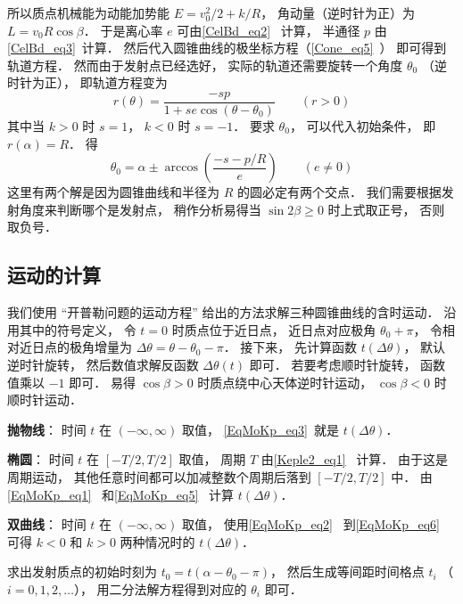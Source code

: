 所以质点机械能为动能加势能 $E = v_0^2/2 + k/R$， 角动量（逆时针为正）为 $L = v_0 R\cos\beta$． 于是离心率 $e$ 可由\autoref{CelBd_eq2}~ 计算， 半通径 $p$ 由\autoref{CelBd_eq3}~计算． 然后代入圆锥曲线的极坐标方程（\autoref{Cone_eq5}~） 即可得到轨道方程． 然而由于发射点已经选好， 实际的轨道还需要旋转一个角度 $\theta_0$ （逆时针为正）， 即轨道方程变为
\begin{equation}\label{KepNum_eq1}
r(\theta)  = \frac{-s p}{1 + s e\cos (\theta-\theta_0)} \qquad (r > 0)
\end{equation}
其中当 $k>0$ 时 $s=1$， $k<0$ 时 $s=-1$． 要求 $\theta_0$， 可以代入初始条件， 即 $r(\alpha) = R$． 得
\begin{equation}
\theta_0 = \alpha \pm \arccos(\frac{-s - p/R}{e}) \qquad (e\ne 0)
\end{equation}
这里有两个解是因为圆锥曲线和半径为 $R$ 的圆必定有两个交点． 我们需要根据发射角度来判断哪个是发射点， 稍作分析易得当 $\sin2\beta \geqslant 0$ 时上式取正号， 否则取负号．

\subsection{运动的计算}


我们使用 “开普勒问题的运动方程” 给出的方法求解三种圆锥曲线的含时运动． 沿用其中的符号定义， 令 $t=0$ 时质点位于近日点，  近日点对应极角 $\theta_0 + \pi$， 令相对近日点的极角增量为 $\Delta\theta = \theta - \theta_0 - \pi$． 接下来， 先计算函数 $t(\Delta\theta)$， 默认逆时针旋转， 然后数值求解反函数 $\Delta\theta(t)$ 即可． 若要考虑顺时针旋转， 函数值乘以 $-1$ 即可． 易得 $\cos\beta > 0$ 时质点绕中心天体逆时针运动， $\cos\beta < 0$ 时顺时针运动．

\textbf{抛物线}： 时间 $t$ 在 $(-\infty,\infty)$ 取值， \autoref{EqMoKp_eq3}~就是 $t(\Delta\theta)$．

\textbf{椭圆}： 时间 $t$ 在 $[-T/2,T/2]$ 取值， 周期 $T$ 由\autoref{Keple2_eq1}~ 计算． 由于这是周期运动， 其他任意时间都可以加减整数个周期后落到 $[-T/2,T/2]$ 中． 由\autoref{EqMoKp_eq1}~ 和\autoref{EqMoKp_eq5}~ 计算 $t(\Delta\theta)$．

\textbf{双曲线}： 时间 $t$ 在 $(-\infty,\infty)$ 取值， 使用\autoref{EqMoKp_eq2}~ 到\autoref{EqMoKp_eq6}~ 可得 $k<0$ 和 $k>0$ 两种情况时的 $t(\Delta\theta)$．

求出发射质点的初始时刻为 $t_0 = t(\alpha - \theta_0 - \pi)$， 然后生成等间距时间格点 $t_i$ （$i=0,1,2,\dots$）， 用二分法解方程得到对应的 $\theta_i$ 即可．

